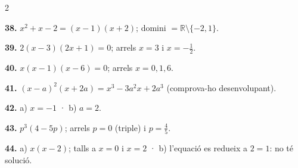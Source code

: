 \documentclass[13pt,a4paper]{extarticle}
\begin{document}
\begin{multicols}{2}
\begin{minipage}{\linewidth}
\end{minipage}\par\vspace{1.6mm}
\par\noindent\begin{minipage}{\linewidth}
\textbf{38.} $x^2+x-2=(x-1)(x+2)$; domini $=\mathbb{R}\setminus\{-2,1\}$.\par
\end{minipage}\par\vspace{1.6mm}
\par\noindent\begin{minipage}{\linewidth}
\textbf{39.} $2(x-3)(2x+1)=0$; arrels $x=3$ i $x=-\tfrac12$.\par
\end{minipage}\par\vspace{1.6mm}
\par\noindent\begin{minipage}{\linewidth}
\textbf{40.} $x(x-1)(x-6)=0$; arrels $x=0,1,6$.\par
\end{minipage}\par\vspace{1.6mm}
\par\noindent\begin{minipage}{\linewidth}
\textbf{41.} $(x-a)^2(x+2a)=x^3-3a^2x+2a^3$ (comprova-ho desenvolupant).\par
\end{minipage}\par\vspace{1.6mm}
\par\noindent\begin{minipage}{\linewidth}
\textbf{42.} a) $x=-1$ · b) $a=2$.\par
\end{minipage}\par\vspace{1.6mm}
\par\noindent\begin{minipage}{\linewidth}
\textbf{43.} $p^3(4-5p)$; arrels $p=0$ (triple) i $p=\tfrac45$.\par
\end{minipage}\par\vspace{1.6mm}
\par\noindent\begin{minipage}{\linewidth}
\textbf{44.} a) $x(x-2)$; talls a $x=0$ i $x=2$ · b) l'equació es redueix a $2=1$: no té solució.\par

\end{minipage}
\end{multicols}
\end{document}
